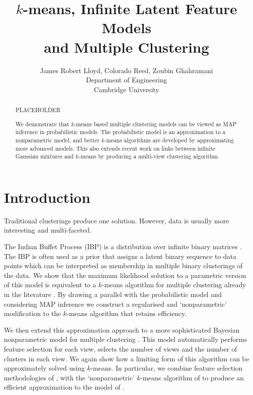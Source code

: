 \documentclass{article}
\title{
$k$-means, Infinite Latent Feature Models\\ and Multiple Clustering
}
\author{
James Robert Lloyd, Colorado Reed, Zoubin Ghahramani\\
Department of Engineering\\
Cambridge University\\
}
\numberwithin{equation}{section}
\numberwithin{thm}{section}
\begin{document}
\maketitle

\begin{abstract}
PLACEHOLDER

We demonstrate that $k$-means based multiple clustering models can be viewed as MAP inference in probabilistic models.
The probabilistic model is an approximation to a nonparametric model, and better $k$-means algorithms are developed by approximating more advanced models.
This also extends recent work on links between infinite Gaussian mixtures and $k$-means by producing a multi-view clustering algorithm.
\end{abstract}

\section{Introduction}


Traditional clusterings \citep[e.g.][]{Jain2000} produce one solution.
However, data is usually more interesting and multi-faceted.

The Indian Buffet Process (IBP) is a distribution over infinite binary matrices \citep[e.g.][]{Griffiths2011}.
The IBP is often used as a prior that assigns a latent binary sequence to data points which can be interpreted as membership in multiple binary clusterings of the data.
We show that the maximum likelihood solution to a parametric version of this model is equivalent to a $k$-means algorithm for multiple clustering already in the literature \citep{Cui2007}.
By drawing a parallel with the probabilistic model and considering MAP inference we construct a regularised \citep[e.g.][]{Sun2012} and `nonparametric' modification to the $k$-means algorithm that retains efficiency.

We then extend this approximation approach to a more sophisticated Bayesian nonparametric model for multiple clustering \citep{Niu2012}.
This model automatically performs feature selection for each view, selects the number of views and the number of clusters in each view.
We again show how a limiting form of this algorithm can be approximately solved using $k$-means.
In particular, we combine feature selection methodologies of \citep{Dy2004}, with the `nonparametric' $k$-means algorithm of \cite{Kulis2012} to produce an efficient approximation to the model of \cite{Niu2012}.
\end{document}
